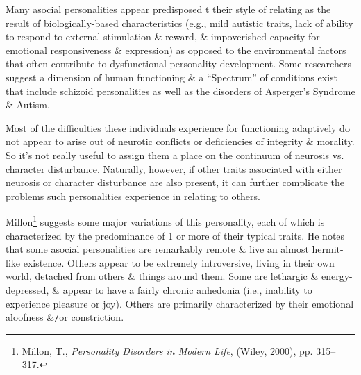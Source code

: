 \documentclass{article}
\numberwithin{equation}{section}
\begin{document}
Many asocial personalities appear predisposed t their style of relating as the result of biologically-based characteristics (e.g., mild autistic traits, lack of ability to respond to external stimulation \& reward, \& impoverished capacity for emotional responsiveness \& expression) as opposed to the environmental factors that often contribute to dysfunctional personality development. Some researchers suggest a dimension of human functioning \& a ``Spectrum'' of conditions exist that include schizoid personalities as well as the disorders of Asperger's Syndrome \& Autism.

Most of the difficulties these individuals experience for functioning adaptively do not appear to arise out of neurotic conflicts or deficiencies of integrity \& morality. So it's not really useful to assign them a place on the continuum of neurosis vs. character disturbance. Naturally, however, if other traits associated with either neurosis or character disturbance are also present, it can further complicate the problems such personalities experience in relating to others.

Millon\footnote{Millon, T., \textit{Personality Disorders in Modern Life}, (Wiley, 2000), pp. 315--317.} suggests some major variations of this personality, each of which is characterized by the predominance of 1 or more of their typical traits. He notes that some asocial personalities are remarkably remote \& live an almost hermit-like existence. Others appear to be extremely introversive, living in their own world, detached from others \& things around them. Some are lethargic \& energy-depressed, \& appear to have a fairly chronic anhedonia (i.e., inability to experience pleasure or joy). Others are primarily characterized by their emotional aloofness \&\texttt{/}or constriction.
\end{document}
